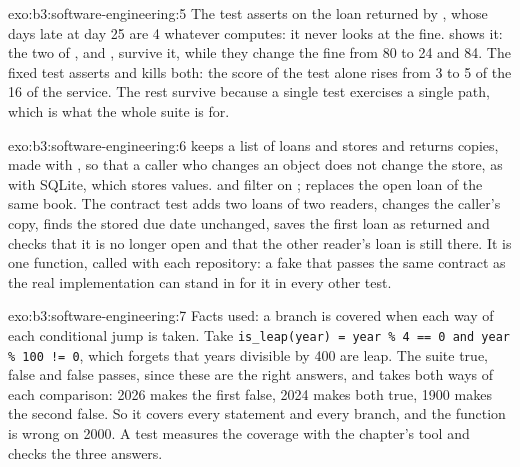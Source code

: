 \begin{solution}{exo:b3:software-engineering:5}
The test asserts on the loan returned by , whose days late at day 25 are 4 whatever  computes: it never looks at the fine.  shows it: the two  of ,  and , survive it, while they change the fine from 80 to 24 and 84. The fixed test asserts  and kills both: the score of the test alone rises from 3 to 5 of the 16  of the service. The rest survive because a single test exercises a single path, which is what the whole suite is for.
\end{solution}

\begin{solution}{exo:b3:software-engineering:6}
 keeps a list of loans and stores and returns copies, made with , so that a caller who changes an object does not change the store, as with SQLite, which stores values.  and  filter on ;  replaces the open loan of the same book. The contract test adds two loans of two readers, changes the caller's copy, finds the stored due date unchanged, saves the first loan as returned and checks that it is no longer open and that the other reader's loan is still there. It is one function, called with each repository: a fake that passes the same contract as the real implementation can stand in for it in every other test.
\end{solution}

\begin{solution}{exo:b3:software-engineering:7}
Facts used: a branch is covered when each way of each conditional jump is taken. Take \texttt{is\_leap(year) = year \% 4 == 0 and year \% 100 != 0}, which forgets that years divisible by 400 are leap. The suite  true,  false and  false passes, since these are the right answers, and takes both ways of each comparison: 2026 makes the first false, 2024 makes both true, 1900 makes the second false. So it covers every statement and every branch, and the function is wrong on 2000. A test measures the coverage with the chapter's tool and checks the three answers.
\end{solution}

